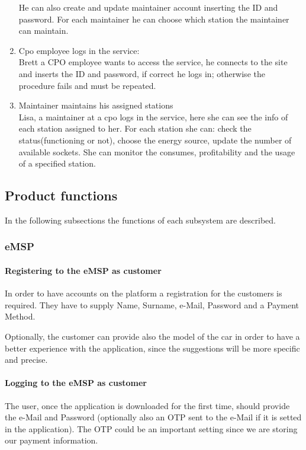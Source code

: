 \begin{enumerate}[label=S\arabic*]
            He can also create and update maintainer account inserting the ID and password. For each maintainer he can choose which station the maintainer can maintain.
      \item Cpo employee logs in the service:\\
            Brett a CPO employee wants to access the service, he connects to the site and inserts the ID
            and password, if correct he logs in; otherwise the procedure fails and must be repeated.
      \item Maintainer maintains his assigned stations\\
            Lisa, a maintainer at a cpo logs in the service, here she can see the info of each station assigned to her.
            For each station she can: check the status(functioning or not), choose the energy source, update the number of available sockets.
            She can monitor the consumes, profitability and the usage of a specified station.
\end{enumerate}

\subsection{Product functions}
In the following subsections the functions of each subsystem are described.


\subsubsection{\ac{eMSP}}
\paragraph{Registering to the \ac{eMSP} as customer}
In order to have accounts on the platform a registration for the customers is required. They have to supply Name, Surname, e-Mail, Password and a Payment Method.

Optionally, the customer can provide also the model of the car in order to have a better experience with the application, since the suggestions will be more specific and precise.

\paragraph{Logging to the \ac{eMSP} as customer}
The user, once the application is downloaded for the first time, should provide the e-Mail and Password (optionally also an OTP sent to the e-Mail if it is setted in the application). The OTP could be an important setting since we are storing our payment information.

